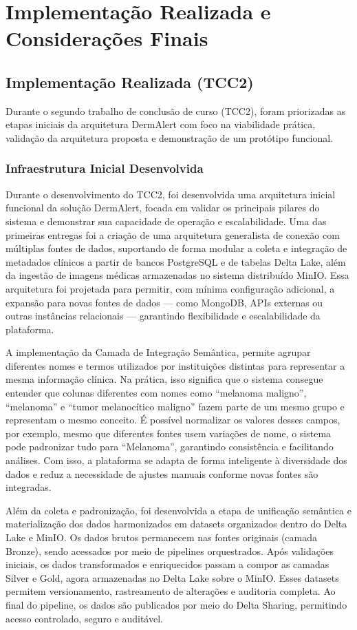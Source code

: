\chapter{Implementação Realizada e Considerações Finais}


\section{Implementação Realizada (TCC2)}
Durante o segundo trabalho de conclusão de curso (TCC2), foram priorizadas as etapas iniciais da arquitetura DermAlert com foco na viabilidade prática, validação da arquitetura proposta e demonstração de um protótipo funcional.

\subsection{Infraestrutura Inicial Desenvolvida}
Durante o desenvolvimento do TCC2, foi desenvolvida uma arquitetura inicial
 funcional da solução DermAlert, focada em validar os principais pilares do sistema e demonstrar sua capacidade de operação e escalabilidade.
  Uma das primeiras entregas foi a criação de uma arquitetura generalista de conexão com múltiplas fontes de dados,
   suportando de forma modular a coleta e integração de metadados clínicos a partir de bancos PostgreSQL e de tabelas Delta Lake,
    além da ingestão de imagens médicas armazenadas no sistema distribuído MinIO.
     Essa arquitetura foi projetada para permitir, com mínima configuração adicional, a expansão para novas fontes de dados — 
como MongoDB, APIs externas ou outras instâncias relacionais — garantindo flexibilidade e escalabilidade da plataforma.

A implementação da Camada de Integração Semântica, permite agrupar diferentes nomes e termos utilizados por instituições distintas para representar a mesma informação clínica. Na prática, isso significa que o sistema consegue entender que colunas diferentes com nomes como “melanoma maligno”, “melanoma” e “tumor melanocítico maligno” fazem parte de um mesmo grupo e representam o mesmo conceito. É possível normalizar os valores desses campos, por exemplo, mesmo que diferentes fontes usem variações de nome, o sistema pode padronizar tudo para “Melanoma”, garantindo consistência e facilitando análises. Com isso, a plataforma se adapta de forma inteligente à diversidade dos dados e reduz a necessidade de ajustes manuais conforme novas fontes são integradas.

Além da coleta e padronização, foi desenvolvida a etapa de unificação semântica e materialização dos dados harmonizados em datasets
 organizados dentro do Delta Lake e MinIO. Os dados brutos permanecem nas fontes originais (camada Bronze), sendo acessados por meio de pipelines orquestrados. Após validações iniciais, os dados transformados e enriquecidos passam a compor as camadas Silver e Gold, agora armazenadas no Delta Lake sobre o MinIO. Esses datasets permitem versionamento, rastreamento de alterações e auditoria completa. Ao final do pipeline, os dados são publicados por meio do Delta Sharing, permitindo acesso controlado, seguro e auditável.

